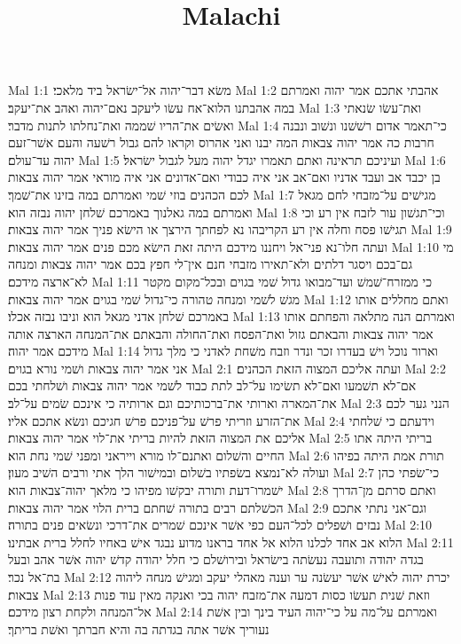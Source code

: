 

\title{Malachi}

Mal 1:1  משׂא דבר־יהוה אל־ישׂראל ביד מלאכי׃
Mal 1:2  אהבתי אתכם אמר יהוה ואמרתם במה אהבתנו הלוא־אח עשׂו ליעקב נאם־יהוה ואהב את־יעקב׃
Mal 1:3  ואת־עשׂו שׂנאתי ואשׂים את־הריו שׁממה ואת־נחלתו לתנות מדבר׃
Mal 1:4  כי־תאמר אדום רשׁשׁנו ונשׁוב ונבנה חרבות כה אמר יהוה צבאות המה יבנו ואני אהרוס וקראו להם גבול רשׁעה והעם אשׁר־זעם יהוה עד־עולם׃
Mal 1:5  ועיניכם תראינה ואתם תאמרו יגדל יהוה מעל לגבול ישׂראל׃
Mal 1:6  בן יכבד אב ועבד אדניו ואם־אב אני איה כבודי ואם־אדונים אני איה מוראי אמר יהוה צבאות לכם הכהנים בוזי שׁמי ואמרתם במה בזינו את־שׁמך׃
Mal 1:7  מגישׁים על־מזבחי לחם מגאל ואמרתם במה גאלנוך באמרכם שׁלחן יהוה נבזה הוא׃
Mal 1:8  וכי־תגשׁון עור לזבח אין רע וכי תגישׁו פסח וחלה אין רע הקריבהו נא לפחתך הירצך או הישׂא פניך אמר יהוה צבאות׃
Mal 1:9  ועתה חלו־נא פני־אל ויחננו מידכם היתה זאת הישׂא מכם פנים אמר יהוה צבאות׃
Mal 1:10  מי גם־בכם ויסגר דלתים ולא־תאירו מזבחי חנם אין־לי חפץ בכם אמר יהוה צבאות ומנחה לא־ארצה מידכם׃
Mal 1:11  כי ממזרח־שׁמשׁ ועד־מבואו גדול שׁמי בגוים ובכל־מקום מקטר מגשׁ לשׁמי ומנחה טהורה כי־גדול שׁמי בגוים אמר יהוה צבאות׃
Mal 1:12  ואתם מחללים אותו באמרכם שׁלחן אדני מגאל הוא וניבו נבזה אכלו׃
Mal 1:13  ואמרתם הנה מתלאה והפחתם אותו אמר יהוה צבאות והבאתם גזול ואת־הפסח ואת־החולה והבאתם את־המנחה הארצה אותה מידכם אמר יהוה׃
Mal 1:14  וארור נוכל וישׁ בעדרו זכר ונדר וזבח משׁחת לאדני כי מלך גדול אני אמר יהוה צבאות ושׁמי נורא בגוים׃
Mal 2:1  ועתה אליכם המצוה הזאת הכהנים׃
Mal 2:2  אם־לא תשׁמעו ואם־לא תשׂימו על־לב לתת כבוד לשׁמי אמר יהוה צבאות ושׁלחתי בכם את־המארה וארותי את־ברכותיכם וגם ארותיה כי אינכם שׂמים על־לב׃
Mal 2:3  הנני גער לכם את־הזרע וזריתי פרשׁ על־פניכם פרשׁ חגיכם ונשׂא אתכם אליו׃
Mal 2:4  וידעתם כי שׁלחתי אליכם את המצוה הזאת להיות בריתי את־לוי אמר יהוה צבאות׃
Mal 2:5  בריתי היתה אתו החיים והשׁלום ואתנם־לו מורא וייראני ומפני שׁמי נחת הוא׃
Mal 2:6  תורת אמת היתה בפיהו ועולה לא־נמצא בשׂפתיו בשׁלום ובמישׁור הלך אתי ורבים השׁיב מעון׃
Mal 2:7  כי־שׂפתי כהן ישׁמרו־דעת ותורה יבקשׁו מפיהו כי מלאך יהוה־צבאות הוא׃
Mal 2:8  ואתם סרתם מן־הדרך הכשׁלתם רבים בתורה שׁחתם ברית הלוי אמר יהוה צבאות׃
Mal 2:9  וגם־אני נתתי אתכם נבזים ושׁפלים לכל־העם כפי אשׁר אינכם שׁמרים את־דרכי ונשׂאים פנים בתורה׃
Mal 2:10  הלוא אב אחד לכלנו הלוא אל אחד בראנו מדוע נבגד אישׁ באחיו לחלל ברית אבתינו׃
Mal 2:11  בגדה יהודה ותועבה נעשׂתה בישׂראל ובירושׁלם כי חלל יהודה קדשׁ יהוה אשׁר אהב ובעל בת־אל נכר׃
Mal 2:12  יכרת יהוה לאישׁ אשׁר יעשׂנה ער וענה מאהלי יעקב ומגישׁ מנחה ליהוה צבאות׃
Mal 2:13  וזאת שׁנית תעשׂו כסות דמעה את־מזבח יהוה בכי ואנקה מאין עוד פנות אל־המנחה ולקחת רצון מידכם׃
Mal 2:14  ואמרתם על־מה על כי־יהוה העיד בינך ובין אשׁת נעוריך אשׁר אתה בגדתה בה והיא חברתך ואשׁת בריתך׃
